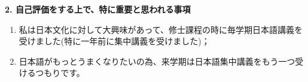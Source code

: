 \documentclass[11pt,a4paper,twoside]{jarticle}
\newcommand{\研究課題名}{Symmetry breaking operators}
\newcommand{\研究機関名}{東京大学}
\newcommand{\申請者氏名}{レオンチエフ\,オレクシィ}
\newcommand{\研究代表者氏名}{\申請者氏名}
\newcommand{\研究期間の最終元号年度}{31}	%
\begin{document}
{\vspace{5mm}
{\bf 2. 自己評価をする上で、特に重要と思われる事項}
\begin{enumerate}
	\item 私は日本文化に対して大興味があって、修士課程の時に毎学期日本語講義を受けました(特に一年前に集中講義を受けました)；
	\item 日本語がもっとうまくなりたいの為、来学期は日本語集中講義をもう一つ受けるつもりです。
\end{enumerate}
}





\end{document}

